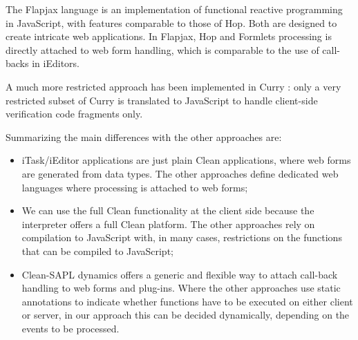 The \textsf{Flapjax} language \cite{FLAPJAX} is an implementation of functional reactive programming in \textsf{JavaScript}, with features comparable to those of \textsf{Hop}. Both are designed to create intricate web applications. In \textsf{Flapjax}, \textsf{Hop} and \textsf{Formlets} processing is directly attached to web form handling, which is comparable to the use of call-backs in \textsf{iEditors}. 

A much more restricted approach has been implemented in \textsf{Curry} \cite{hanm07:PPDP}: only a very restricted subset of \textsf{Curry} is translated to \textsf{JavaScript} to handle client-side verification code fragments only.

Summarizing the main differences with the other approaches are:
\begin{itemize}
	\item \textsf{iTask}/\textsf{iEditor} applications are just plain \textsf{Clean} applications, where web forms are generated from data types. The other approaches define dedicated web languages where processing is attached to web forms;
	\item We can use the full \textsf{Clean} functionality at the client side because the \Sapl interpreter offers a full Clean platform. The other approaches rely on compilation to \textsf{JavaScript} with, in many cases, restrictions on the functions that can be compiled to \textsf{JavaScript};
	\item \textsf {Clean-SAPL} dynamics offers a generic and flexible way to attach call-back handling to web forms and plug-ins. 
	Where the other approaches use static annotations to indicate whether functions have to be executed on either client or server, in our approach this can be decided dynamically, depending on the events to be processed.
\end{itemize}

